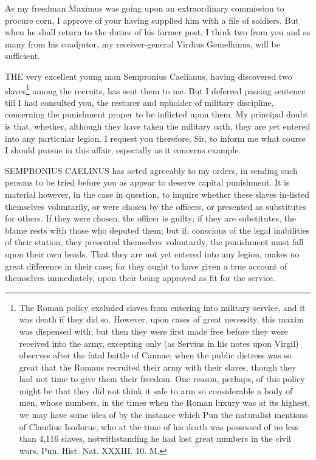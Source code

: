 
As my freedman Maximus was going upon an extraordinary commission to
procure corn, I approve of your having supplied him with a file of
soldiers. But when he shall return to the duties of his former post, I
think two from you and as many from his coadjutor, my receiver-general
Virdius Gemelhinus, will be sufficient.


THE very excellent young man Sempronius Caelianus, having discovered two
slaves\footnote{The Roman policy
excluded slaves from entering into military service, and it was death if
they did so. However, upon cases of great necessity, this maxim was
dispensed with; but then they were first made free before they were
received into the army, excepting only (as Servius in his notes upon
Virgil) observes after the fatal battle of Cannae; when the public
distress was so great that the Romans recruited their army with their
slaves, though they had not time to give them their freedom. One reason,
perhaps, of this policy might be that they did not think it safe to arm so
considerable a body of men, whose numbers, in the times when the Roman
luxury was at its highest, we may have some idea of by the instance which
Pun the naturalist mentions of Claudius Isodorus, who at the time of his
death was possessed of no less than 4,116 slaves, notwithstanding he had
lost great numbers in the civil wars. Pun. Hist. Nat. XXXIII. 10. M.} among the recruits, has sent them to me.
But I deferred passing sentence till I had consulted you, the restorer and
upholder of military discipline, concerning the punishment proper to be
inflicted upon them. My principal doubt is that, whether, although they
have taken the military oath, they are yet entered into any particular
legion. I request you therefore, Sir, to inform me what course I should
pursue in this affair, especially as it concerns example.


SEMPRONIUS CAELINUS has acted agreeably to my orders, in sending such
persons to be tried before you as appear to deserve capital punishment. It
is material however, in the case in question, to inquire whether these
slaves in-listed themselves voluntarily, or were chosen by the officers,
or presented as substitutes for others. If they were chosen, the officer
is guilty; if they are substitutes, the blame rests with those who deputed
them; but if, conscious of the legal inabilities of their station, they
presented themselves voluntarily, the punishment must fall upon their own
heads. That they are not yet entered into any legion, makes no great
difference in their case; for they ought to have given a true account of
themselves immediately, upon their being approved as fit for the service.

